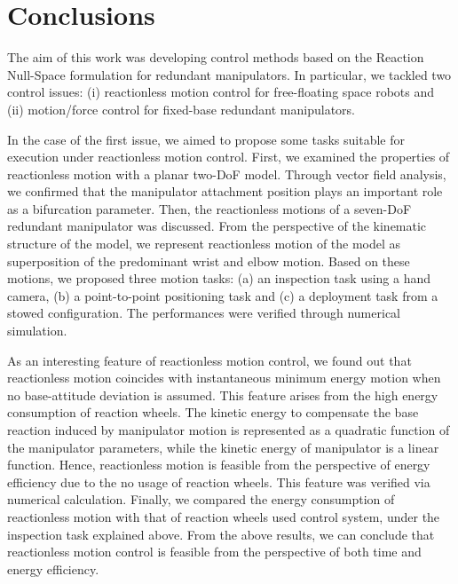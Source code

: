 %

\section{Conclusions}
The aim of this work was developing control methods based on the Reaction Null-Space formulation
for redundant manipulators.
In particular, we tackled two control issues:
(i) reactionless motion control for free-floating space robots and
(ii) motion/force control for fixed-base redundant manipulators.

In the case of the first issue,
we aimed to propose some tasks suitable for execution under reactionless motion control.
First, we examined the properties of reactionless motion with a planar two-DoF model.
Through vector field analysis,
we confirmed that the manipulator attachment position plays an important role as a bifurcation parameter.
Then, the reactionless motions of a seven-DoF redundant manipulator was discussed.
From the perspective of the kinematic structure of the model,
we represent reactionless motion of the model as superposition of the
predominant wrist and elbow motion.
Based on these motions,
we proposed three motion tasks:
(a) an inspection task using a hand camera,
(b) a point-to-point positioning task and
(c) a deployment task from a stowed configuration.
The performances were verified through numerical simulation.

As an interesting feature of reactionless motion control,
we found out that reactionless motion coincides with instantaneous minimum energy motion
when no base-attitude deviation is assumed.
This feature arises from the high energy consumption of reaction wheels.
The kinetic energy to compensate the base reaction induced by manipulator motion is represented
as a quadratic function of the manipulator parameters,
while the kinetic energy of manipulator is a linear function.
Hence, reactionless motion is feasible from the perspective of energy efficiency due to the no usage of
reaction wheels.
This feature was verified via numerical calculation.
Finally, we compared the energy consumption of reactionless motion with
that of reaction wheels used control system,
under the inspection task explained above.
From the above results,
we can conclude that reactionless motion control is feasible from the perspective of both time and
energy efficiency.

